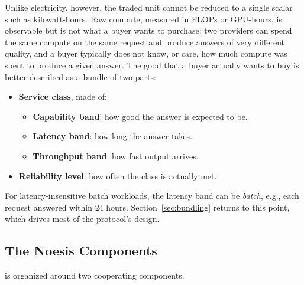Unlike electricity, however, the traded unit cannot be reduced to a single
scalar such as kilowatt-hours. Raw compute, measured in FLOPs or GPU-hours,
is observable but is not what a buyer wants to purchase: two providers can
spend the same compute on the same request and produce answers of very
different quality, and a buyer typically does not know, or care, how much
compute was spent to produce a given answer. The good that a buyer actually
wants to buy is better described as a bundle of two parts:

\begin{itemize}
  \item \textbf{Service class}, made of:
    \begin{itemize}
      \item \textbf{Capability band}: how good the answer is expected to be.
      \item \textbf{Latency band}: how long the answer takes.
      \item \textbf{Throughput band}: how fast output arrives.
    \end{itemize}
  \item \textbf{Reliability level}: how often the class is actually met.
\end{itemize}

For latency-insensitive batch workloads, the latency band can be \emph{batch},
e.g., each request answered within 24 hours.
Section~\ref{sec:bundling} returns to this point, which drives most of the
protocol's design.

\subsection{The Noesis Components}
\label{sec:protocol_overview}

\Noesis{} is organized around two cooperating components.

